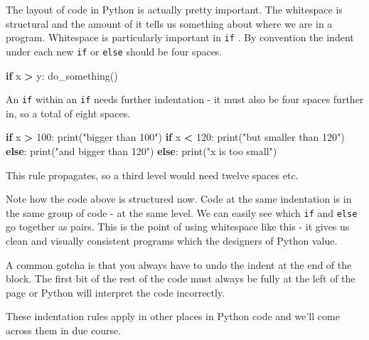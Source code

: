 \documentclass[]{book}
\newenvironment{Shaded}{\begin{snugshade}}{\end{snugshade}}
\newcommand{\BuiltInTok}[1]{#1}
\newcommand{\ControlFlowTok}[1]{\textcolor[rgb]{0.13,0.29,0.53}{\textbf{#1}}}
\newcommand{\DecValTok}[1]{\textcolor[rgb]{0.00,0.00,0.81}{#1}}
\newcommand{\NormalTok}[1]{#1}
\newcommand{\OperatorTok}[1]{\textcolor[rgb]{0.81,0.36,0.00}{\textbf{#1}}}
\newcommand{\StringTok}[1]{\textcolor[rgb]{0.31,0.60,0.02}{#1}}
\theoremstyle{definition}
\theoremstyle{definition}
\theoremstyle{definition}
\theoremstyle{remark}
\begin{document}
The layout of code in Python is actually pretty important. The
whitespace is structural and the amount of it tells us something about
where we are in a program. Whitespace is particularly important in
\texttt{if} . By convention the indent under each new \texttt{if} or
\texttt{else} should be four spaces.

\begin{Shaded}
\begin{Highlighting}[]
\ControlFlowTok{if}\NormalTok{ x }\OperatorTok{>}\NormalTok{ y:}
\NormalTok{    do_something()}
\end{Highlighting}
\end{Shaded}

An \texttt{if} within an \texttt{if} needs further indentation - it must
also be four spaces further in, so a total of eight spaces.

\begin{Shaded}
\begin{Highlighting}[]
\ControlFlowTok{if}\NormalTok{ x }\OperatorTok{>} \DecValTok{100}\NormalTok{:}
    \BuiltInTok{print}\NormalTok{(}\StringTok{"bigger than 100"}\NormalTok{)}
    \ControlFlowTok{if}\NormalTok{ x  }\OperatorTok{<} \DecValTok{120}\NormalTok{:}
        \BuiltInTok{print}\NormalTok{(}\StringTok{"but smaller than 120"}\NormalTok{)}
    \ControlFlowTok{else}\NormalTok{:}
        \BuiltInTok{print}\NormalTok{(}\StringTok{"and bigger than 120"}\NormalTok{)}
\ControlFlowTok{else}\NormalTok{:}
    \BuiltInTok{print}\NormalTok{(}\StringTok{"x is too small"}\NormalTok{)}
\end{Highlighting}
\end{Shaded}

This rule propagates, so a third level would need twelve spaces etc.

Note how the code above is structured now. Code at the same indentation
is in the same group of code - at the same level. We can easily see
which \texttt{if} and \texttt{else} go together as pairs. This is the
point of using whitespace like this - it gives us clean and visually
consistent programs which the designers of Python value.

A common gotcha is that you always have to undo the indent at the end of
the block. The first bit of the rest of the code must always be fully at
the left of the page or Python will interpret the code incorrectly.

These indentation rules apply in other places in Python code and we'll
come across them in due course.
\end{document}

